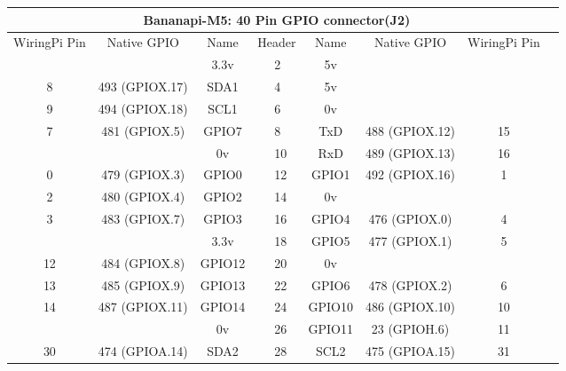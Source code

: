 \documentclass[11pt,a4paper]{article}
\begin{document}
\begin{sffamily}
\begin{center}
\begin{tabular}{|c|c|c||p{8mm}|p{8mm}||c|c|c|c|}
\hline
\multicolumn{8}{|c|}{\bfseries{Bananapi-M5: 40 Pin GPIO connector(J2)}}\\
\hline
\hline
WiringPi Pin	& Native GPIO	& Name	& \multicolumn{2}{|c||}{Header}	& Name	& Native GPIO	& WiringPi Pin\\
\hline
\hline
	& 					& \textcolor{rtb-red}{3.3v}		& \raggedleft{1} &  2 & \textcolor{rtb-maroon}{5v}		&			 		& \\
\hline
8	& 493 (GPIOX.17)	& \textcolor{rtb-aqua}{SDA1}	& \raggedleft{3} &  4 & \textcolor{rtb-maroon}{5v}		& 					& \\
\hline
9	& 494 (GPIOX.18)	& \textcolor{rtb-aqua}{SCL1}	& \raggedleft{5} &  6 & \textcolor{rtb-black}{0v}		& 					& \\
\hline
7	& 481 (GPIOX.5)		& \textcolor{rtb-green}{GPIO7}	& \raggedleft{7} &  8 & \textcolor{rtb-yellow}{TxD}		& 488 (GPIOX.12)	& 15\\
\hline
	&			 		& \textcolor{rtb-black}{0v}		& \raggedleft{9} & 10 & \textcolor{rtb-yellow}{RxD}		& 489 (GPIOX.13)	& 16\\
\hline
0	& 479 (GPIOX.3)		& \textcolor{rtb-green}{GPIO0}	& \raggedleft{11} & 12 & \textcolor{rtb-green}{GPIO1}	& 492 (GPIOX.16)	& 1\\
\hline
2	& 480 (GPIOX.4)		& \textcolor{rtb-green}{GPIO2}	& \raggedleft{13} & 14 & \textcolor{rtb-black}{0v}		& 					& \\
\hline
3	& 483 (GPIOX.7)		& \textcolor{rtb-green}{GPIO3}	& \raggedleft{15} & 16 & \textcolor{rtb-green}{GPIO4}	& 476 (GPIOX.0)		& 4\\
\hline
	& 					& \textcolor{rtb-red}{3.3v}		& \raggedleft{17} & 18 & \textcolor{rtb-green}{GPIO5}	& 477 (GPIOX.1)		& 5\\
\hline
12	& 484 (GPIOX.8)		& \textcolor{rtb-green}{GPIO12}	& \raggedleft{19} & 20 & \textcolor{rtb-black}{0v}		& 					& \\
\hline
13	& 485 (GPIOX.9)	& \textcolor{rtb-green}{GPIO13}	& \raggedleft{21} & 22 & \textcolor{rtb-green}{GPIO6}	& 478 (GPIOX.2)		& 6\\
\hline
14	& 487 (GPIOX.11)	& \textcolor{rtb-green}{GPIO14}	& \raggedleft{23} & 24 & \textcolor{rtb-green}{GPIO10}	& 486 (GPIOX.10)	& 10\\
\hline
	& 					& \textcolor{rtb-black}{0v}		& \raggedleft{25} & 26 & \textcolor{rtb-green}{GPIO11}	& 23 (GPIOH.6)	& 11\\
\hline
30	& 474 (GPIOA.14)	& \textcolor{rtb-aqua}{SDA2}	& \raggedleft{27} & 28 & \textcolor{rtb-aqua}{SCL2}		& 475 (GPIOA.15)	& 31\\

\end{tabular}
\end{center}
\end{sffamily}
\end{document}
